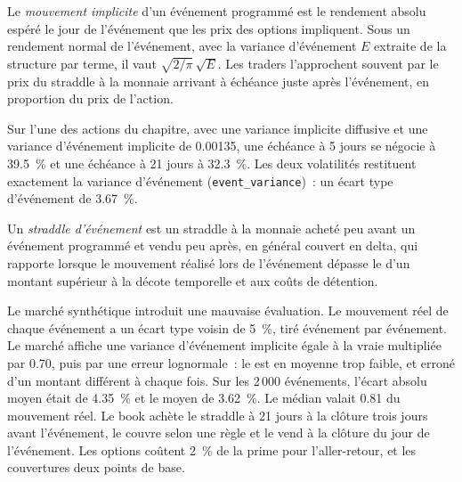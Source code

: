 \begin{definition}\label{def:s2:gamma-scalping-and-event-volatility:move}
Le \emph{mouvement implicite} d'un événement programmé est le rendement absolu espéré le jour de l'événement que les prix des options impliquent. Sous un
rendement normal de l'événement, avec la variance d'événement $E$ extraite de la structure par terme, il vaut $\sqrt{2/\pi}\,\sqrt{E}$. Les traders l'approchent souvent par
le prix du straddle à la monnaie arrivant à échéance juste après l'événement, en proportion du prix de l'action.
\end{definition}

Sur l'une des actions du chapitre, avec une variance implicite diffusive et une variance d'événement implicite de 0.00135, une échéance à 5 jours se négocie à 39.5~\% et une
échéance à 21 jours à 32.3~\%. Les deux volatilités restituent exactement la variance d'événement (\texttt{event\_variance})~: un écart type d'événement de 3.67~\%.

\begin{definition}\label{def:s2:gamma-scalping-and-event-volatility:straddle}
Un \emph{straddle d'événement} est un straddle à la monnaie acheté peu avant un événement programmé et vendu peu après, en général
couvert en delta, qui rapporte lorsque le mouvement réalisé lors de l'événement dépasse le  d'un montant supérieur à la décote temporelle et aux coûts de détention.
\end{definition}

Le marché synthétique introduit une mauvaise évaluation. Le mouvement réel de chaque événement a un écart type voisin de 5~\%, tiré événement par événement. Le marché affiche une
variance d'événement implicite égale à la vraie multipliée par 0.70, puis par une erreur lognormale~: le  est en moyenne trop faible, et erroné d'un montant différent
à chaque fois. Sur les 2\,000 événements, l'écart absolu moyen était de 4.35~\% et le  moyen de 3.62~\%. Le  médian valait 0.81 du
mouvement réel. Le book achète le straddle à 21 jours à la clôture trois jours avant l'événement, le couvre selon une règle et le vend à la clôture du jour de l'événement.
Les options coûtent 2~\% de la prime pour l'aller-retour, et les couvertures deux points de base.

